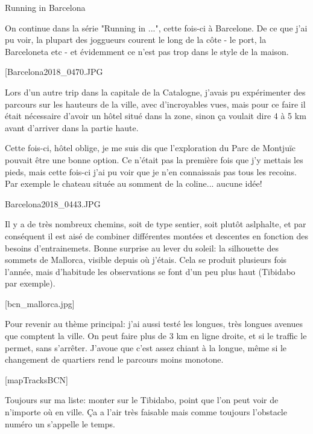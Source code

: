 Running in Barcelona

On continue dans la série "Running in ...", cette fois-ci à Barcelone. De ce que j'ai pu voir, la plupart des joggueurs courent le long de la côte - le port, la Barceloneta etc - et évidemment ce n'est pas trop dans le style de la maison.

[Barcelona2018_0470.JPG

Lors d'un autre trip dans la capitale de la Catalogne, j'avais pu expérimenter des parcours sur les hauteurs de la ville, avec d'incroyables vues, mais pour ce faire il était nécessaire d'avoir un hôtel situé dans la zone, sinon ça voulait dire 4 à 5 km avant d'arriver dans la partie haute.

Cette fois-ci, hôtel oblige, je me suis dis que l'exploration du Parc de Montjuïc pouvait être une bonne option. Ce n'était pas la première fois que j'y mettais les pieds, mais cette fois-ci j'ai pu voir que je n'en connaissais pas tous les recoins. Par exemple le chateau située au somment de la coline... aucune idée! 

Barcelona2018_0443.JPG

Il y a de très nombreux chemins, soit de type sentier, soit plutôt aslphalte, et par conséquent il est aisé de combiner différentes montées et descentes en fonction des besoins d'entrainemets. Bonne surprise au lever du soleil: la silhouette des sommets de Mallorca, visible depuis où j'étais. Cela se produit plusieurs fois l'année, mais d'habitude les observations se font d'un peu plus haut (Tibidabo par exemple).

[bcn_mallorca.jpg]

Pour revenir au thème principal: j'ai aussi testé les longues, très longues avenues que comptent la ville. On peut faire plus de 3 km en ligne droite, et si le traffic le permet, sans s'arrêter. J'avoue que c'est assez chiant à la longue, même si le changement de quartiers rend le parcours moins monotone.

[mapTracksBCN]

Toujours sur ma liste: monter sur le Tibidabo, point que l'on peut voir de n'importe où en ville. Ça a l'air très faisable mais comme toujours l'obstacle numéro un s'appelle le temps.


